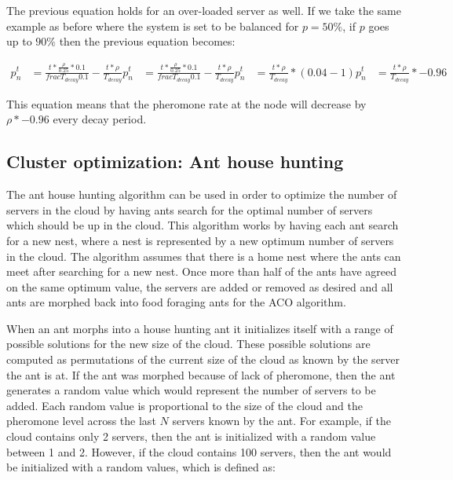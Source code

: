 The previous equation holds for an over-loaded server as well. If we take the same example as before where the system is set to be balanced for $p = 50\%$, if $p$ goes up to $90\%$ then the previous equation becomes:

\begin{equation}
\begin{aligned}
p^{t}_{n} &= \frac{t *  \frac{\rho}{0.25} * 0.1}{frac{T_{decay}}{0.1}} - \frac{t *  \rho}{T_{decay}}
p^{t}_{n} &= \frac{t *  \frac{\rho}{0.25} * 0.1}{frac{T_{decay}}{0.1}} - \frac{t *  \rho}{T_{decay}}
p^{t}_{n} &= \frac{t * \rho}{T_{decay}} * (0.04 - 1)
p^{t}_{n} &= \frac{t * \rho}{T_{decay}} * -0.96
\end{aligned}
\end{equation}

This equation means that the pheromone rate at the node will decrease by $\rho * -0.96$ every decay period.

\subsection{Cluster optimization: Ant house hunting}

The ant house hunting algorithm can be used in order to optimize the number of servers in the cloud by having ants search for the optimal number of servers which should be up in the cloud. This algorithm works by having each ant search for a new nest, where a nest is represented by a new optimum number of servers in the cloud. The algorithm assumes that there is a home nest where the ants can meet after searching for a new nest. Once more than half of the ants have agreed on the same optimum value, the servers are added or removed as desired and all ants are morphed back into food foraging ants for the ACO algorithm. \cite{selforg:antreloc}

When an ant morphs into a house hunting ant it initializes itself with a range of possible solutions for the new size of the cloud. These possible solutions are computed as permutations of the current size of the cloud as known by the server the ant is at. If the ant was morphed because of lack of pheromone, then the ant generates a random value which would represent the number of servers to be added. Each random value is proportional to the size of the cloud and the pheromone level across the last $N$ servers known by the ant. For example, if the cloud contains only 2 servers, then the ant is initialized with a random value between 1 and 2. However, if the cloud contains 100 servers, then the ant would be initialized with a random values, which is defined as:

